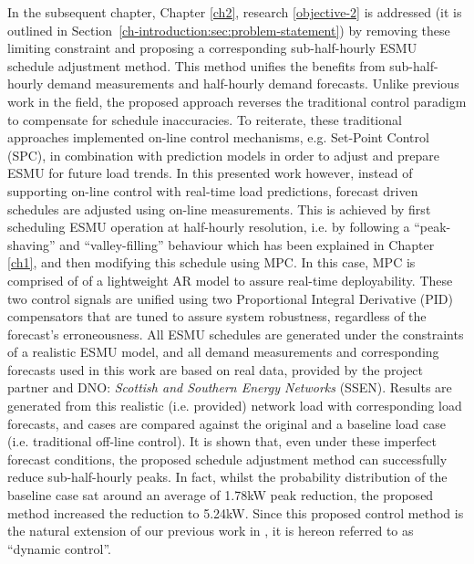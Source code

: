 In the subsequent chapter, Chapter \ref{ch2}, research \ref{objective-2} is addressed (it is outlined in Section~\ref{ch-introduction:sec:problem-statement}) by removing these limiting constraint and proposing a corresponding sub-half-hourly ESMU schedule adjustment method.
This method unifies the benefits from sub-half-hourly demand measurements and half-hourly demand forecasts.
Unlike previous work in the field, the proposed approach reverses the traditional control paradigm to compensate for schedule inaccuracies.
To reiterate, these traditional approaches implemented on-line control mechanisms, e.g. Set-Point Control (SPC), in combination with prediction models in order to adjust and prepare ESMU for future load trends.
In this presented work however, instead of supporting on-line control with real-time load predictions, forecast driven schedules are adjusted using on-line measurements.
This is achieved by first scheduling ESMU operation at half-hourly resolution, i.e. by following a ``peak-shaving'' and ``valley-filling'' behaviour which has been explained in Chapter \ref{ch1}, and then modifying this schedule using MPC.
In this case, MPC is comprised of of a lightweight AR model to assure real-time deployability.
These two control signals are unified using two Proportional Integral Derivative (PID) compensators that are tuned to assure system robustness, regardless of the forecast's erroneousness.
All ESMU schedules are generated under the constraints of a realistic ESMU model, and all demand measurements and corresponding forecasts used in this work are based on real data, provided by the project partner and DNO: \textit{Scottish and Southern Energy Networks} (SSEN).
Results are generated from this realistic (i.e. provided) network load with corresponding load forecasts, and cases are compared against the original and a baseline load case (i.e. traditional off-line control).
It is shown that, even under these imperfect forecast conditions, the proposed schedule adjustment method can successfully reduce sub-half-hourly peaks.
In fact, whilst the probability distribution of the baseline case sat around an average of 1.78kW peak reduction, the proposed method increased the reduction to 5.24kW.
Since this proposed control method is the natural extension of our previous work in \cite{Zangs2016}, it is hereon referred to as ``dynamic control''.

